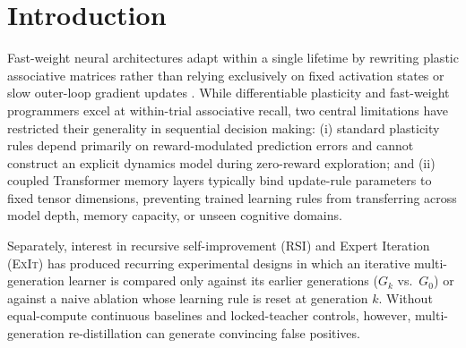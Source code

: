 \documentclass[11pt]{article}
\begin{document}
\begin{abstract}
(\texttt{M7}) are evaluated, diagnosing generational $\theta$-reset exploration collapse as the underlying mechanism.
\end{abstract}

\section{Introduction}
\label{sec:intro}

Fast-weight neural architectures \citep{schmidhuber1992learning,ba2016using,miconi2018differentiable,schlag2021linear} adapt within a single lifetime by rewriting plastic associative matrices rather than relying exclusively on fixed activation states or slow outer-loop gradient updates \citep{finn2017model,wang2016learning,duan2016rl2}. While differentiable plasticity and fast-weight programmers excel at within-trial associative recall, two central limitations have restricted their generality in sequential decision making: (i) standard plasticity rules depend primarily on reward-modulated prediction errors and cannot construct an explicit dynamics model during zero-reward exploration; and (ii) coupled Transformer memory layers typically bind update-rule parameters to fixed tensor dimensions, preventing trained learning rules from transferring across model depth, memory capacity, or unseen cognitive domains.

Separately, interest in recursive self-improvement (RSI) and Expert Iteration (\textsc{ExIt}) \citep{schmidhuber2007godel,anthony2017thinking,silver2017mastering,kirsch2021meta} has produced recurring experimental designs in which an iterative multi-generation learner is compared only against its earlier generations ($G_k$ vs.\ $G_0$) or against a naive ablation whose learning rule is reset at generation $k$. Without equal-compute continuous baselines and locked-teacher controls, however, multi-generation re-distillation can generate convincing false positives.
\end{document}
